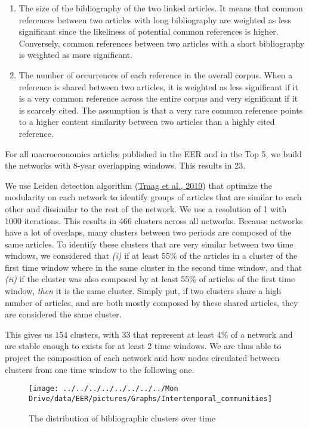 \documentclass[
  12pt,
  onecolumn]{article}
\providecommand{\tightlist}{%
  \setlength{\itemsep}{0pt}\setlength{\parskip}{0pt}}
\begin{document}
\begin{enumerate}
\def\labelenumi{\arabic{enumi}.}
\tightlist
\item
  The size of the bibliography of the two linked articles. It means that
  common references between two articles with long bibliography are
  weighted as less significant since the likeliness of potential common
  references is higher. Conversely, common references between two
  articles with a short bibliography is weighted as more significant.
\item
  The number of occurrences of each reference in the overall corpus.
  When a reference is shared between two articles, it is weighted as
  less significant if it is a very common reference across the entire
  corpus and very significant if it is scarcely cited. The assumption is
  that a very rare common reference points to a higher content
  similarity between two articles than a highly cited reference.
\end{enumerate}

For all macroeconomics articles published in the EER and in the Top 5,
we build the networks with 8-year overlapping windows. This results in
23.

We use Leiden detection algorithm
(\protect\hyperlink{ref-traag2019}{Traag et al., 2019}) that optimize
the modularity on each network to identify groups of articles that are
similar to each other and dissimilar to the rest of the network. We use
a resolution of 1 with 1000 iterations. This results in 466 clusters
across all networks. Because networks have a lot of overlaps, many
clusters between two periods are composed of the same articles. To
identify these clusters that are very similar between two time windows,
we considered that \emph{(i)} if at least 55\% of the articles in a
cluster of the first time window where in the same cluster in the second
time window, and that \emph{(ii)} if the cluster was also composed by at
least 55\% of articles of the first time window, \emph{then} it is the
same cluster. Simply put, if two clusters share a high number of
articles, and are both mostly composed by these shared articles, they
are considered the same cluster.

This gives us 154 clusters, with 33 that represent at least 4\% of a
network and are stable enough to exists for at least 2 time windows. We
are thus able to project the composition of each network and how nodes
circulated between clusters from one time window to the following one.

\begin{figure}[h]

{\centering \texttt{[image: ../../../../../../../../Mon Drive/data/EER/pictures/Graphs/Intertemporal\_communities]} 

}

\caption{The distribution of bibliographic clusters over time}\label{fig:plot-cluster-flow}
\end{figure}
\end{document}
